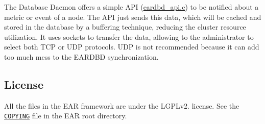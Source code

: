The Database Daemon offers a simple A\+PI ({\ttfamily \hyperlink{eardbd__api_8c}{eardbd\+\_\+api.\+c}}) to be notified about a metric or event of a node. The A\+PI just sends this data, which will be cached and stored in the database by a buffering technique, reducing the cluster resource utilization. It uses sockets to transfer the data, allowing to the administrator to select both T\+CP or U\+DP protocols. U\+DP is not recommended because it can add too much mess to the E\+A\+R\+D\+BD synchronization.

\subsection*{License }

All the files in the E\+AR framework are under the L\+G\+P\+Lv2. license. See the \href{../../COPYING}{\tt C\+O\+P\+Y\+I\+NG} file in the E\+AR root directory. 